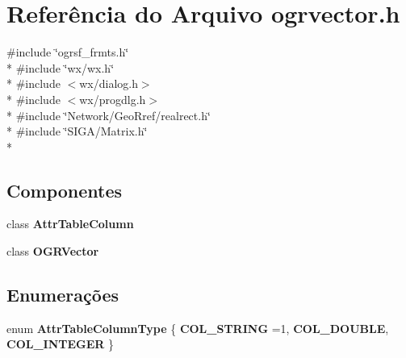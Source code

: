 \section{Referência do Arquivo ogrvector.\+h}
\label{ogrvector_8h}
{\ttfamily \#include \char`\"{}ogrsf\+\_\+frmts.\+h\char`\"{}}\\*
{\ttfamily \#include \char`\"{}wx/wx.\+h\char`\"{}}\\*
{\ttfamily \#include $<$wx/dialog.\+h$>$}\\*
{\ttfamily \#include $<$wx/progdlg.\+h$>$}\\*
{\ttfamily \#include \char`\"{}Network/\+Geo\+Rref/realrect.\+h\char`\"{}}\\*
{\ttfamily \#include \char`\"{}S\+I\+G\+A/\+Matrix.\+h\char`\"{}}\\*
\subsection*{Componentes}
\begin{DoxyCompactItemize}
\item 
class {\bf Attr\+Table\+Column}
\item 
class {\bf O\+G\+R\+Vector}
\end{DoxyCompactItemize}
\subsection*{Enumerações}
\begin{DoxyCompactItemize}
\item 
enum {\bf Attr\+Table\+Column\+Type} \{ {\bf C\+O\+L\+\_\+\+S\+T\+R\+I\+NG} =1, 
{\bf C\+O\+L\+\_\+\+D\+O\+U\+B\+LE}, 
{\bf C\+O\+L\+\_\+\+I\+N\+T\+E\+G\+ER}
 \}
\end{DoxyCompactItemize}
